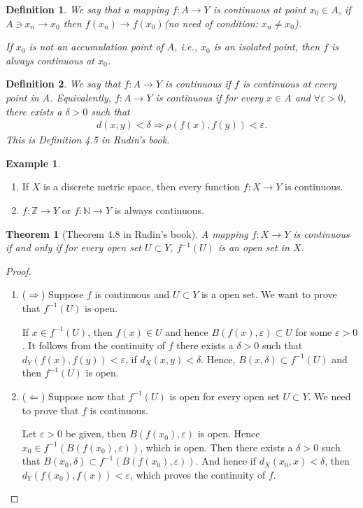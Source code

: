 \documentclass[12pt,leqno]{amsart}
\newtheorem{definition}{Definition}[section]
\newtheorem{theorem}{Theorem}[section]
\theoremstyle{definition}
\newtheorem{example}{Example}[section]
\numberwithin{equation}{subsection}
\begin{document}
\begin{definition}
We say that a mapping $f:A\to Y$ is continuous at point $x_0\in A$, if $A\ni x_n\to x_0$ then $f(x_n)\to f(x_0)$(no need of condition: $x_n\neq x_0$). 

If $x_0$ is not an accumulation point of $A$, i.e., $x_0$ is an isolated point, then $f$ is always continuous at $x_0$.
\end{definition}

\begin{definition}
We say that $f:A\to Y$ is continuous if $f$ is continuous at every point in $A$. Equivalently, $f:A\to Y$ is continuous if for every $x\in A$ and $\forall\varepsilon>0$, there exists a $\delta>0$ such that 
\begin{align*}
    d(x,y)<\delta \Rightarrow \rho(f(x),f(y))<\varepsilon.
\end{align*}
This is Definition 4.5 in Rudin's book. 
\end{definition}

\begin{example}
~\begin{enumerate}
    \item If $X$ is a discrete metric space, then every function $f:X\to Y$ is continuous.
    \item $f:\mathbb{Z}\to Y$ or $f:\mathbb{N}\to Y$ is always continuous.
\end{enumerate}
\end{example}

\medskip

\begin{theorem}[Theorem 4.8 in Rudin's book]
A mapping $f:X\to Y$ is continuous if and only if for every open set $U\subset Y$, $f^{-1}(U)$ is an open set in $X$.
\end{theorem}
\begin{proof}
~\begin{enumerate}
    \item ($\Rightarrow$) Suppose $f$ is continuous and $U\subset Y$ is a open set. We want to prove that $f^{-1}(U)$ is open. 
    
    If $x\in f^{-1}(U)$, then $f(x)\in U$ and hence $B(f(x),\varepsilon)\subset U$ for some $\varepsilon > 0$. It follows from the continuity of $f$ there exists a $\delta > 0$ such that $d_Y(f(x),f(y))<\varepsilon$, if $d_X(x,y) < \delta$. Hence, $B(x,\delta)\subset f^{-1}(U)$ and then $f^{-1}(U)$ is open.
    \item ($\Leftarrow$) Suppose now that $f^{-1}(U)$ is open for every open set $U\subset Y$. We need to prove that $f$ is continuous. 
    
    Let $\varepsilon>0$ be given, then $B(f(x_0),\varepsilon)$ is open. Hence $x_0\in f^{-1}(B(f(x_0),\varepsilon))$, which is open. Then there exists a $\delta>0$ such that $B(x_0,\delta)\subset f^{-1}(B(f(x_0),\varepsilon))$. And hence if $d_X(x_0,x)<\delta$, then $d_Y(f(x_0),f(x))<\varepsilon$, which proves the continuity of $f$.
\end{enumerate}
\end{proof}
\end{document}

